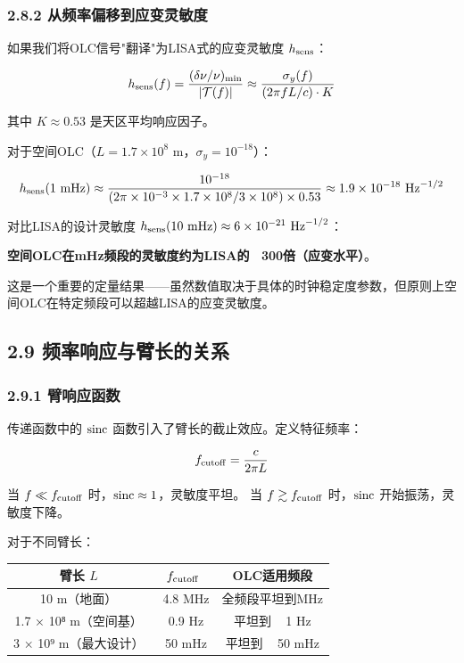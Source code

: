 \documentclass[12pt,a4paper]{article}
\begin{document}
\subsubsection{2.8.2 从频率偏移到应变灵敏度}


如果我们将OLC信号"翻译"为LISA式的应变灵敏度 $h_{\rm sens}$：

$$h_{\rm sens}(f) = \frac{(\delta\nu/\nu)_{\rm min}}{|\mathcal{T}(f)|} \approx \frac{\sigma_y(f)}{(2\pi f L/c) \cdot K}$$

其中 $K \approx 0.53$ 是天区平均响应因子。

对于空间OLC（$L = 1.7 \times 10^8$ m，$\sigma_y = 10^{-18}$）：

$$h_{\rm sens}(1\ {\rm mHz}) \approx \frac{10^{-18}}{(2\pi \times 10^{-3} \times 1.7\times 10^8 / 3\times 10^8) \times 0.53} \approx 1.9 \times 10^{-18}\ {\rm Hz}^{-1/2}$$

对比LISA的设计灵敏度 $h_{\rm sens}(10\ {\rm mHz}) \approx 6 \times 10^{-21}\ {\rm Hz}^{-1/2}$：

\textbf{空间OLC在mHz频段的灵敏度约为LISA的 ~300倍（应变水平）}。

这是一个重要的定量结果——虽然数值取决于具体的时钟稳定度参数，但原则上空间OLC在特定频段可以超越LISA的应变灵敏度。

\subsection{2.9 频率响应与臂长的关系}


\subsubsection{2.9.1 臂响应函数}


传递函数中的 ${\rm sinc}$ 函数引入了臂长的截止效应。定义特征频率：

$$f_{\rm cutoff} = \frac{c}{2\pi L}$$

当 $f \ll f_{\rm cutoff}$ 时，${\rm sinc} \approx 1$，灵敏度平坦。
当 $f \gtrsim f_{\rm cutoff}$ 时，${\rm sinc}$ 开始振荡，灵敏度下降。

对于不同臂长：

\begin{tabular}{|c|c|c|}
\hline
臂长 $L$ & $f_{\rm cutoff}$ & OLC适用频段 \\
\hline
10 m（地面） & ~4.8 MHz & 全频段平坦到MHz \\
1.7 × 10⁸ m（空间基） & ~0.9 Hz & 平坦到 ~ 1 Hz \\
3 × 10⁹ m（最大设计） & ~50 mHz & 平坦到 ~ 50 mHz \\
\hline
\end{tabular}
\end{document}
